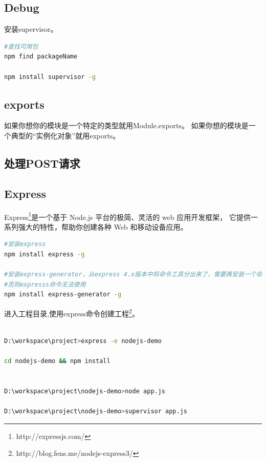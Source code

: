 \documentclass{book}
\begin{document}
\subsection{Debug}

安装supervisor。

\begin{lstlisting}[language=Bash]
#查找可用包
npm find packageName

npm install supervisor -g
\end{lstlisting}

\subsection{exports}

如果你想你的模块是一个特定的类型就用Module.exports。
如果你想的模块是一个典型的“实例化对象”就用exports。

\subsection{处理POST请求}

\subsection{Express}

Express\footnote{http://expressjs.com/}是一个基于 Node.js 平台的极简、灵活的 web 应用开发框架，
它提供一系列强大的特性，帮助你创建各种 Web 和移动设备应用。 

\begin{lstlisting}[language=Bash]
#安装express
npm install express -g

#安装express-generator，从express 4.x版本中将命令工具分出来了，需要再安装一个命令工具
#否则expresss命令无法使用
npm install express-generator -g 
\end{lstlisting}

进入工程目录,使用express命令创建工程\footnote{http://blog.fens.me/nodejs-express3/}。

\begin{lstlisting}[language=Bash]

D:\workspace\project>express -e nodejs-demo

cd nodejs-demo && npm install


D:\workspace\project\nodejs-demo>node app.js

D:\workspace\project\nodejs-demo>supervisor app.js

\end{lstlisting}
\end{document}
